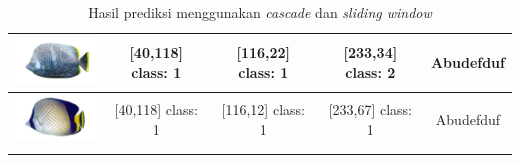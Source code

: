 \begin{longtable}{|c|c|c|c|c|}
	\includegraphics[width=3cm]{gambar/dataset_validasi/Chaetodon24} & [40,118] class: 1 & [116,22] class: 1 & [233,34] class: 2 & Abudefduf \\ \hline
	\includegraphics[width=3cm]{gambar/dataset_validasi/Chaetodon25} & [40,118] class: 1 & [116,12] class: 1 & [233,67] class: 1 & Abudefduf \\ \hline

	
	\caption{Hasil prediksi menggunakan \emph{cascade} dan \emph{sliding window}}
	\label{tab: Classification result}
  \end{longtable}